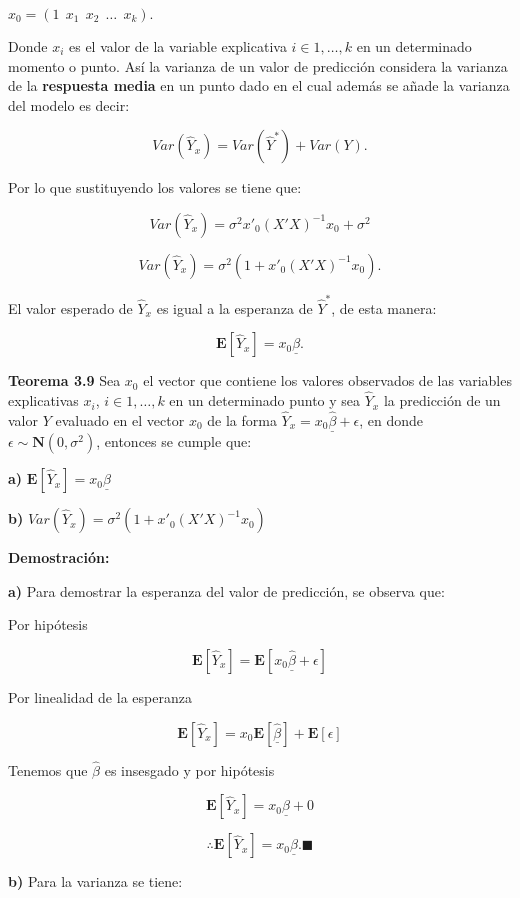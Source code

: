 \documentclass[a4paper,oneside,openany]{book}
\begin{document}
\(x_{0}=\left( 1 \ \ x_{1} \ \ x_{2} \ \ \ldots \ \ x_{k} \right).\)

Donde \(x_{i}\) es el valor de la variable explicativa
\(i \in 1, \ldots,k\) en un determinado momento o punto. Así la varianza
de un valor de predicción considera la varianza de la \textbf{respuesta
media} en un punto dado en el cual además se añade la varianza del
modelo es decir:

\[Var(\hat{Y}_{x})=Var(\hat{Y}^*)+Var(Y).\]

Por lo que sustituyendo los valores se tiene que:

\[Var(\hat{Y}_{x})=\sigma^2x'_{0}(X'X)^{-1}x_{0}+\sigma^2\]

\[Var(\hat{Y}_{x})=\sigma^2\left(1+x'_{0}(X'X)^{-1}x_{0}\right).\]

El valor esperado de \(\hat{Y}_{x}\) es igual a la esperanza de
\(\hat{Y}^*\), de esta manera:

\[\mathbf{E}[\hat{Y}_{x}]=x_{0}\underline{\beta}.\]

\textbf{Teorema 3.9} Sea \(x_{0}\) el vector que contiene los valores
observados de las variables explicativas \(x_{i}\), \(i \in 1,\ldots,k\)
en un determinado punto y sea \(\hat{Y}_{x}\) la predicción de un valor
\(Y\) evaluado en el vector \(x_{0}\) de la forma
\(\hat{Y}_{x}=x_{0}\underline{\hat{\beta}}+\epsilon\), en donde
\(\epsilon \sim \mathbf{N}(0,\sigma^2)\), entonces se cumple que:

\textbf{a)} \(\mathbf{E}[\hat{Y}_{x}]=x_{0}\underline{\beta}\)

\textbf{b)}
\(Var(\hat{Y}_{x})=\sigma^2\left(1+x'_{0}(X'X)^{-1}x_{0}\right)\)

\textbf{Demostración:}

\textbf{a)} Para demostrar la esperanza del valor de predicción, se
observa que:

Por hipótesis

\[\mathbf{E}[\hat{Y}_{x}]=\mathbf{E}[x_{0}\underline{\hat{\beta}}+\epsilon]\]

Por linealidad de la esperanza

\[\mathbf{E}[\hat{Y}_{x}]=x_{0}\mathbf{E}[\underline{\hat{\beta}}]+\mathbf{E}[\epsilon]\]

Tenemos que \(\hat{\beta}\) es insesgado y por hipótesis

\[\mathbf{E}[\hat{Y}_{x}]=x_{0}\underline{\beta}+0\]

\[\therefore \mathbf{E}[\hat{Y}_{x}]=x_{0}\underline{\beta}. \blacksquare\]

\textbf{b)} Para la varianza se tiene:
\end{document}
